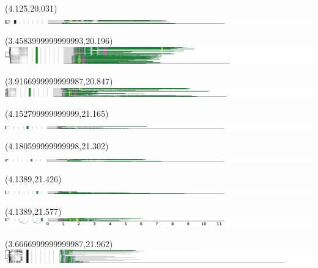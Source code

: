 \documentclass{article}
\begin{document}
\begin{textblock}{13}(4.125,20.031)\includegraphics{haplotypes-constrained/14qtel_1-500K_1_12_12_rc-HG001.pdf}\end{textblock}
\begin{textblock}{13}(3.4583999999999993,20.196)\includegraphics{haplotypes-constrained/14qtel_1-500K_1_12_12_rc-HG002.pdf}\end{textblock}
\begin{textblock}{13}(3.9166999999999987,20.847)\includegraphics{haplotypes-constrained/14qtel_1-500K_1_12_12_rc-HG003.pdf}\end{textblock}
\begin{textblock}{13}(4.152799999999999,21.165)\includegraphics{haplotypes-constrained/14qtel_1-500K_1_12_12_rc-HG004.pdf}\end{textblock}
\begin{textblock}{13}(4.180599999999998,21.302)\includegraphics{haplotypes-constrained/14qtel_1-500K_1_12_12_rc-HG005.pdf}\end{textblock}
\begin{textblock}{13}(4.1389,21.426)\includegraphics{haplotypes-constrained/14qtel_1-500K_1_12_12_rc-HG006.pdf}\end{textblock}
\begin{textblock}{13}(4.1389,21.577)\includegraphics{haplotypes-constrained/14qtel_1-500K_1_12_12_rc-HG007.pdf}\end{textblock}
\begin{textblock}{13}(3.6666999999999987,21.962)\includegraphics{haplotypes-constrained/chr15-HG001.pdf}\end{textblock}
\end{document}
